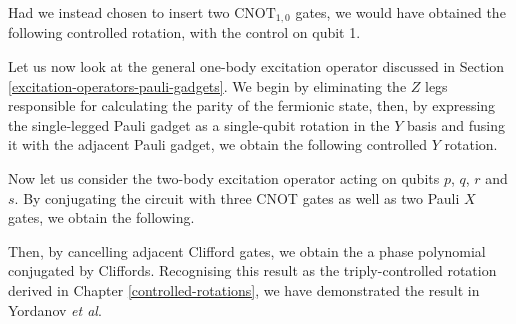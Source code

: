 
Had we instead chosen to insert two $\text{CNOT}_{1, 0}$ gates, we would have obtained the following controlled rotation, with the control on qubit 1.


Let us now look at the general one-body excitation operator discussed in Section \ref{excitation-operators-pauli-gadgets}. We begin by eliminating the $Z$ legs responsible for calculating the parity of the fermionic state, then, by expressing the single-legged Pauli gadget as a single-qubit rotation in the $Y$ basis and fusing it with the adjacent Pauli gadget, we obtain the following controlled $Y$ rotation.


\newpage
Now let us consider the two-body excitation operator acting on qubits $p$, $q$, $r$ and $s$. By conjugating the circuit with three CNOT gates as well as two Pauli $X$ gates, we obtain the following.


Then, by cancelling adjacent Clifford gates, we obtain the a phase polynomial conjugated by Cliffords. Recognising this result as the triply-controlled rotation derived in Chapter \ref{controlled-rotations}, we have demonstrated the result in Yordanov \textit{et al}.

